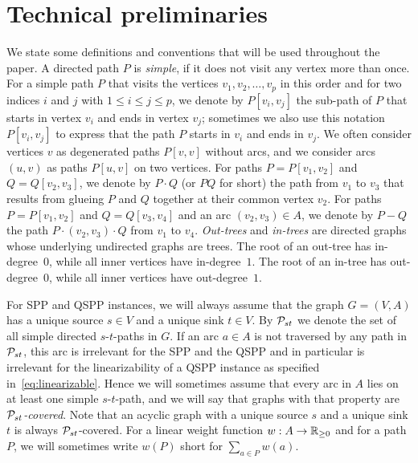 \section{Technical preliminaries}
\label{sec:preliminearies}
We state some definitions and conventions that will be used throughout the paper.
A directed path $P$ is \emph{simple}, if it does not visit any vertex more than once.
For a simple path $P$ that visits the vertices $v_1,v_2,\ldots,v_p$ in this order and 
for two indices $i$ and $j$ with $1\le i\le j\le p$, we denote by $P[v_i,v_j]$ the 
sub-path of $P$ that starts in vertex $v_i$ and ends in vertex $v_j$;
sometimes we also use this notation $P[v_i,v_j]$ to express that the path $P$ starts 
in $v_i$ and ends in $v_j$.
We often consider vertices $v$ as degenerated paths $P[v,v]$ without arcs,
and we consider arcs $(u,v)$ as paths $P[u,v]$ on two vertices.
For paths $P=P[v_1,v_2]$ and $Q=Q[v_2,v_3]$, we denote by $P\cdot Q$ (or $PQ$ for short) the path 
from $v_1$ to $v_3$ that results from glueing $P$ and $Q$ together at their common vertex $v_2$.
For paths $P=P[v_1,v_2]$ and $Q=Q[v_3,v_4]$ and an arc $(v_2,v_3)\in A$, we denote by $P-Q$ 
the path $P\cdot(v_2,v_3)\cdot Q$ from $v_1$ to $v_4$.
\emph{Out-trees} and \emph{in-trees} are directed graphs whose underlying undirected graphs are trees.
The root of an out-tree has  in-degree~$0$, while all inner vertices have  in-degree~$1$.
The root of an  in-tree has out-degree~$0$, while all inner vertices have out-degree~$1$.

For SPP and QSPP instances, we will always assume that the graph $G=(V,A)$ has a unique source $s\in V$ 
and a unique sink $t\in V$. 
By ${\cal P}_{st}$ we denote the set of all simple directed $s$-$t$-paths in $G$.
If an arc $a\in A$ is not traversed by any path in ${\cal P}_{st}$, this arc is irrelevant for
the SPP and the QSPP and in particular is irrelevant for the linearizability of a QSPP 
instance as specified in~\eqref{eq:linearizable}.
Hence we will sometimes assume that every arc in $A$ lies on at least one simple $s$-$t$-path,
and we will say that graphs with that property are \emph{${\cal P}_{st}$-covered}.
Note that an acyclic graph with a unique source $s$ and a unique sink $t$ is always ${\cal P}_{st}$-covered.
For a linear weight function $w:A\to{\mathbb{R}_{\ge0}}$ and for a path $P$, we will sometimes write $w(P)$
short for $\sum_{a\in P}w(a)$.


\medskip
